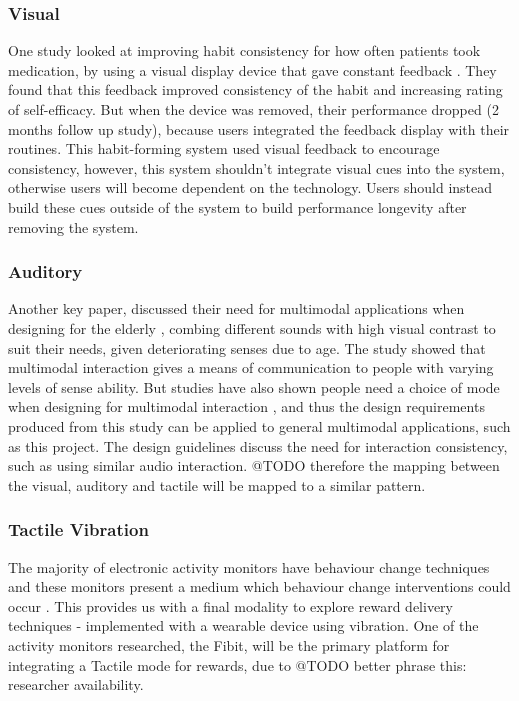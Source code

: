 \subsubsection*{Visual}
One study looked at improving habit consistency for how often patients took medication, by using a visual display device that gave constant feedback \cite{article_realtime_feedback_improving_medication_taking}. They found that this feedback improved consistency of the habit and increasing rating of self-efficacy. But when the device was removed, their performance dropped (2 months follow up study), because users integrated the feedback display with their routines. This habit-forming system used visual feedback to encourage consistency, however, this system shouldn't integrate visual cues into the system, otherwise users will become dependent on the technology. Users should instead build these cues outside of the system to build performance longevity after removing the system.

\subsubsection*{Auditory}
Another key paper, discussed their need for multimodal applications when designing for the elderly \cite{article_movipill_improving_medication_elders}, combing different sounds with high visual contrast to suit their needs, given deteriorating senses due to age. The study showed that multimodal interaction gives a means of communication to people with varying levels of sense ability. But studies have also shown people need a choice of mode when designing for multimodal interaction \cite{article_user_centred_multimodal_reminders}, and thus the design requirements produced from this study can be applied to general multimodal applications, such as this project. The design guidelines discuss the need for interaction consistency, such as using similar audio interaction. @TODO therefore the mapping between the visual, auditory and tactile will be mapped to a similar pattern.


\subsubsection*{Tactile Vibration}
The majority of electronic activity monitors have behaviour change techniques and these monitors present a medium which behaviour change interventions could occur \cite{article_wearable_good}. This provides us with a final modality to explore reward delivery techniques - implemented with a wearable device using vibration. One of the activity monitors researched, the Fibit, will be the primary platform for integrating a Tactile mode for rewards, due to @TODO better phrase this: researcher availability.

